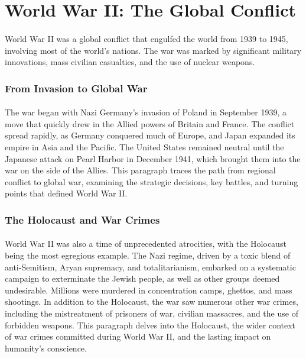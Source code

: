 \documentclass[a4paper,12pt]{book}
\begin{document}
\section*{World War II: The Global Conflict}
\paragraph{}
World War II was a global conflict that engulfed the world from 1939 to 1945, involving most of the world’s nations. The war was marked by significant military innovations, mass civilian casualties, and the use of nuclear weapons.

\subsubsection*{From Invasion to Global War}
\paragraph{}
The war began with Nazi Germany’s invasion of Poland in September 1939, a move that quickly drew in the Allied powers of Britain and France. The conflict spread rapidly, as Germany conquered much of Europe, and Japan expanded its empire in Asia and the Pacific. The United States remained neutral until the Japanese attack on Pearl Harbor in December 1941, which brought them into the war on the side of the Allies. This paragraph traces the path from regional conflict to global war, examining the strategic decisions, key battles, and turning points that defined World War II.

\subsubsection*{The Holocaust and War Crimes}
\paragraph{}
World War II was also a time of unprecedented atrocities, with the Holocaust being the most egregious example. The Nazi regime, driven by a toxic blend of anti-Semitism, Aryan supremacy, and totalitarianism, embarked on a systematic campaign to exterminate the Jewish people, as well as other groups deemed undesirable. Millions were murdered in concentration camps, ghettos, and mass shootings. In addition to the Holocaust, the war saw numerous other war crimes, including the mistreatment of prisoners of war, civilian massacres, and the use of forbidden weapons. This paragraph delves into the Holocaust, the wider context of war crimes committed during World War II, and the lasting impact on humanity’s conscience.
\end{document}

